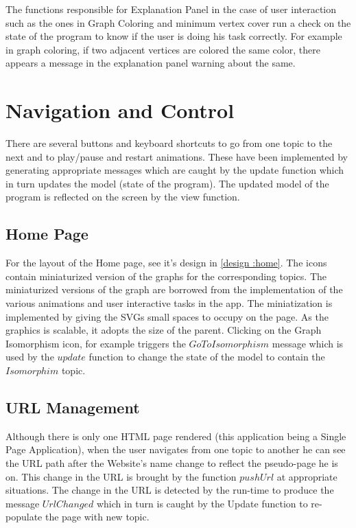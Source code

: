The functions responsible for Explanation Panel in the case of user interaction
such as the ones in Graph Coloring and minimum vertex cover run a check on the
state of the program to know if the user is doing his task correctly. For
example in graph coloring, if two adjacent vertices are colored the same color,
there appears a message in the explanation panel warning about the same.


\section{Navigation and Control}
There are several buttons and keyboard shortcuts to go from one topic to the
next and to play/pause and restart animations. These have been implemented by
generating appropriate messages which are caught by the update function which
in turn updates the model (state of the program). The updated model of the
program is reflected on the screen by the view function.

\subsection{Home Page}
For the layout of the Home page, see it's design in \autoref{design :home}.
The icons contain miniaturized version of the graphs for the corresponding
topics. The miniaturized versions of the graph are borrowed from the
implementation of the various animations and user interactive tasks in the app.
The miniatization is implemented by giving the SVGs small spaces to occupy on
the page. As the graphics is scalable, it adopts the size of the parent.
Clicking on the Graph Isomorphism icon, for example triggers the
$GoToIsomorphism$ message which is used by the $update$ function to change the
state of the model to contain the $Isomorphim$ topic.


\subsection{URL Management}
Although there is only one HTML page rendered (this application being a Single
Page Application), when the user navigates from one topic to another he can see
the URL path after the Website's name change to reflect the pseudo-page he is
on. This change in the URL is brought by the function $pushUrl$ at
appropriate situations.  The change in the URL is detected by the run-time to
produce the message $UrlChanged$ which in turn is caught by the Update function
to re-populate the page with new topic.

